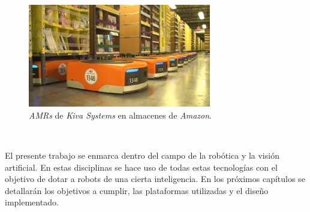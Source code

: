 \begin{figure} [h!]
	\begin{center}
		\includegraphics[width=8cm]{figs/kivasystems}
	\end{center}
	\caption{\textit{AMRs} de \textit{Kiva Systems} en almacenes de \textit{Amazon}.}
	\label{fig:kivasystems}
\end{figure}\

El presente trabajo se enmarca dentro del campo de la robótica y la visión artificial. En estas disciplinas se hace uso de todas estas tecnologías con el objetivo de dotar a robots de una cierta inteligencia. En los próximos capítulos se detallarán los objetivos a cumplir, las plataformas utilizadas y el diseño implementado.\\

